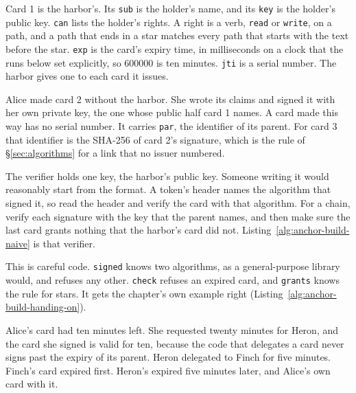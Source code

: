 Card 1 is the harbor's. Its \texttt{sub} is the holder's name, and its
\texttt{key} is the holder's public key. \texttt{can} lists the holder's
rights. A right is a verb, \texttt{read} or \texttt{write}, on a path, and a
path that ends in a star matches every path that starts with the text before
the star. \texttt{exp} is the card's expiry time, in milliseconds on a clock
that the runs below set explicitly, so 600000 is ten minutes. \texttt{jti} is
a serial number. The harbor gives one to each card it issues.

Alice made card 2 without the harbor. She wrote its claims and signed it
with her own private key, the one whose public half card 1 names. A card
made this way has no serial number. It carries \texttt{par}, the identifier
of its parent. For card 3 that identifier is the SHA-256 of card
2's signature, which is the rule of \S\ref{sec:algorithms} for a link that
no issuer numbered.

The verifier holds one key, the harbor's public key. Someone writing it
would reasonably start from the format. A token's header names the algorithm
that signed it, so read the header and verify the card with that algorithm.
For a chain, verify each signature with the key that the parent names, and
then make sure the last card grants nothing that the harbor's card did not.
Listing~\ref{alg:anchor-build-naive} is that verifier.


This is careful code. \texttt{signed} knows two algorithms, as a
general-purpose library would, and refuses any other. \texttt{check} refuses
an expired card, and \texttt{grants} knows the rule for stars.
It gets the chapter's own example right
(Listing~\ref{alg:anchor-build-handing-on}).


Alice's card had ten minutes left. She requested twenty minutes for Heron,
and the card she signed is valid for ten, because the code that delegates a
card never signs past the expiry of its parent. Heron delegated to Finch for
five minutes. Finch's card expired first. Heron's expired five minutes
later, and Alice's own card with it.


